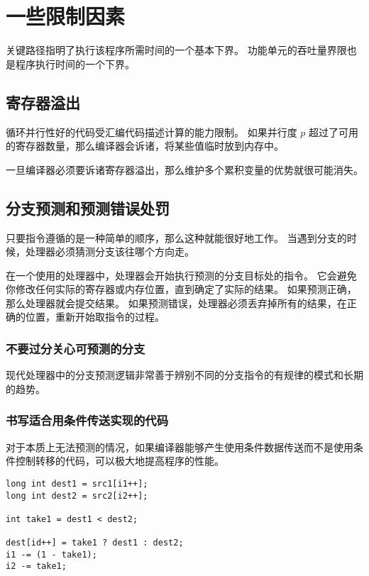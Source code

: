 
\section{一些限制因素}
{
    关键路径指明了执行该程序所需时间的一个基本下界。
    功能单元的吞吐量界限也是程序执行时间的一个下界。

    \subsection{寄存器溢出}
    {
        循环并行性好的代码受汇编代码描述计算的能力限制。
        如果并行度 $p$ 超过了可用的寄存器数量，那么编译器会诉诸，将某些值临时放到内存中。

        一旦编译器必须要诉诸寄存器溢出，那么维护多个累积变量的优势就很可能消失。
    }

    \subsection{分支预测和预测错误处罚}
    {
        只要指令遵循的是一种简单的顺序，那么这种就能很好地工作。
        当遇到分支的时候，处理器必须猜测分支该往哪个方向走。

        在一个使用的处理器中，处理器会开始执行预测的分支目标处的指令。
        它会避免你修改任何实际的寄存器或内存位置，直到确定了实际的结果。
        如果预测正确，那么处理器就会提交结果。
        如果预测错误，处理器必须丢弃掉所有的结果，在正确的位置，重新开始取指令的过程。

        \subsubsection{不要过分关心可预测的分支}
        {
            现代处理器中的分支预测逻辑非常善于辨别不同的分支指令的有规律的模式和长期的趋势。
        }

        \subsubsection{书写适合用条件传送实现的代码}
        {
            对于本质上无法预测的情况，如果编译器能够产生使用条件数据传送而不是使用条件控制转移的代码，可以极大地提高程序的性能。

            \begin{practicec}
                \begin{lstlisting}
long int dest1 = src1[i1++];
long int dest2 = src2[i2++];

int take1 = dest1 < dest2;

dest[id++] = take1 ? dest1 : dest2;
i1 -= (1 - take1);
i2 -= take1;
                \end{lstlisting}
            \end{practicec}
        }
    }
}
